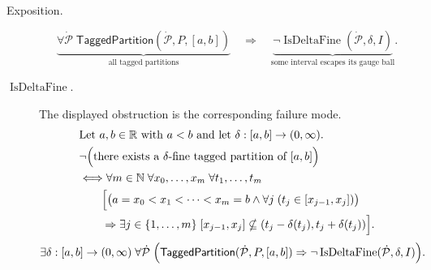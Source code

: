 \begin{remark*}
\begin{description}
  \item[Exposition.]
\[
\underbrace{\forall \dot{\mathcal{P}}\;
\mathsf{TaggedPartition}(\dot{\mathcal{P}},P,[a,b])}_{\text{all tagged partitions}}
\quad\Rightarrow\quad
\underbrace{\neg\operatorname{IsDeltaFine}(\dot{\mathcal{P}},\delta,I)}_{\text{some interval escapes its gauge ball}}.
\]


  \item[\(\operatorname{IsDeltaFine}.\)]
  The displayed obstruction is the corresponding failure mode.
  \[
\begin{aligned}
&\text{Let } a,b \in \mathbb{R} \text{ with } a < b \text{ and let } \delta:[a,b]\to(0,\infty).\\
&\neg\Bigl(\text{there exists a }\delta\text{-fine tagged partition of }[a,b]\Bigr)\\
&\Longleftrightarrow
\forall m \in \mathbb{N}\;\forall x_0,\ldots,x_m\;\forall t_1,\ldots,t_m\\
&\qquad\Bigl[
\bigl(a=x_0<x_1<\cdots<x_m=b
\land \forall j\;(t_j\in[x_{j-1},x_j])\bigr)\\
&\qquad\Rightarrow
\exists j\in\{1,\ldots,m\}\;
[x_{j-1},x_j]\nsubseteq(t_j-\delta(t_j),t_j+\delta(t_j))
\Bigr].
\end{aligned}
  \]
  \[
\exists \delta:[a,b]\to(0,\infty)\;
\forall \dot{\mathcal{P}}\;\Bigl(
\mathsf{TaggedPartition}(\dot{\mathcal{P}},P,[a,b])
\Rightarrow
\neg\operatorname{IsDeltaFine}(\dot{\mathcal{P}},\delta,I)
\Bigr).
  \]
\end{description}
\end{remark*}


